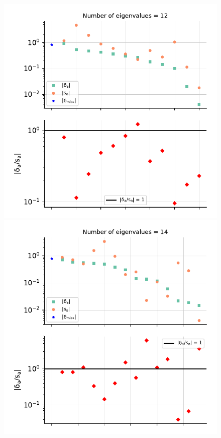 \begin{figure}[H]
\begin{center}
    \includegraphics[scale=0.55]{mhous/plots/projector_eigenvalue_ratio_5barpt_global.pdf}
    \includegraphics[scale=0.55]{mhous/plots/projector_eigenvalue_ratio_7pt_global.pdf}

\end{center}
\end{figure}
